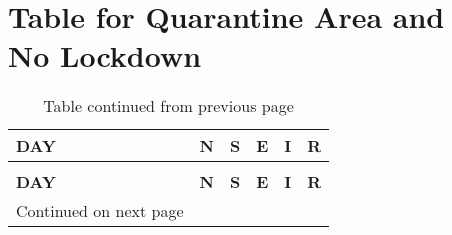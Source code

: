 \chapter{Table for Quarantine Area and \\ No Lockdown}


\begin{longtable}{|l|l|l|l|l|l|}
	\caption{Quarantine Area and No Lockdown} \\
	
	\toprule
	\textbf{DAY} & \textbf{N} & \textbf{S} & \textbf{E }& \textbf{I} &\textbf{ R} \\
	\midrule
	\endfirsthead
	\caption*{Table continued from previous page} \\
	\toprule
	\textbf{DAY} & \textbf{N} & \textbf{S} & \textbf{E }& \textbf{I} &\textbf{ R} \\
	\midrule
	\endhead
	\midrule
	\multicolumn{1}{r}{\footnotesize Continued on next page}
	\endfoot
	\bottomrule
	\endlastfoot
	

\end{longtable}
